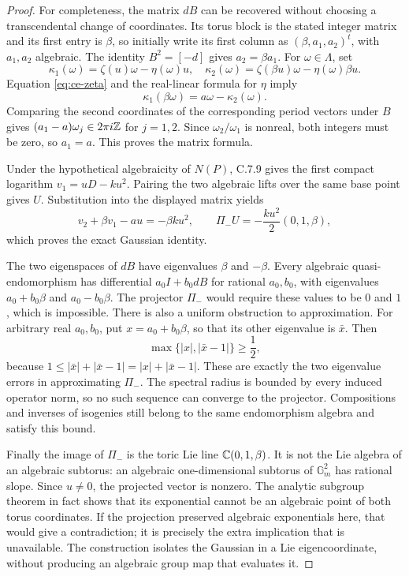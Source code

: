 \begin{proof}
For completeness, the matrix $dB$ can be recovered without
choosing a transcendental change of coordinates. Its torus
block is the stated integer matrix and its first entry is
$\beta$, so initially write its first column as
$(\beta,a_1,a_2)^t$, with $a_1,a_2$ algebraic.
The identity $B^2=[-d]$ gives $a_2=\beta a_1$.
For $\omega\in\Lambda$, set
\[
 \kappa_1(\omega)=\zeta(u)\omega-\eta(\omega)u,
 \quad
 \kappa_2(\omega)=\zeta(\beta u)\omega-\eta(\omega)\beta u.
\]
Equation \eqref{eq:ce-zeta} and the real-linear formula for
$\eta$ imply
\[
 \kappa_1(\beta\omega)=a\omega-\kappa_2(\omega).
\]
Comparing the second coordinates of the corresponding period
vectors under $B$ gives
$(a_1-a)\omega_j\in2\pi i\mathbb Z$ for $j=1,2$.
Since $\omega_2/\omega_1$ is nonreal, both integers must
be zero, so $a_1=a$. This proves the matrix formula.

Under the hypothetical algebraicity of $N(P)$, C.7.9 gives
the first compact logarithm $v_1=uD-ku^2$. Pairing the
two algebraic lifts over the same base point gives $U$.
Substitution into the displayed matrix yields
\[
 v_2+\beta v_1-au=-\beta ku^2,
 \qquad
 \Pi_-U=-\frac{ku^2}{2}(0,1,\beta),
\]
which proves the exact Gaussian identity.

The two eigenspaces of $dB$ have eigenvalues $\beta$ and
$-\beta$. Every algebraic quasi-endomorphism has differential
$a_0I+b_0dB$ for rational $a_0,b_0$, with eigenvalues
$a_0+b_0\beta$ and $a_0-b_0\beta$. The projector
$\Pi_-$ would require these values to be $0$ and $1$,
which is impossible. There is also a uniform obstruction to
approximation. For arbitrary real $a_0,b_0$, put
$x=a_0+b_0\beta$, so that its other eigenvalue is
$\bar x$. Then
\begin{equation}\label{eq:ce-gap}
 \max\{|x|,|\bar x-1|\}\ge\frac12,
\end{equation}
because $1\le|\bar x|+|\bar x-1|=|x|+|\bar x-1|$.
These are exactly the two eigenvalue errors in approximating
$\Pi_-$. The spectral radius is bounded by every induced
operator norm, so no such sequence can converge to the
projector. Compositions and inverses of isogenies still belong
to the same endomorphism algebra and satisfy this bound.

Finally the image of $\Pi_-$ is the toric Lie line
$\mathbb C(0,1,\beta)$. It is not the Lie algebra of an algebraic
subtorus: an algebraic one-dimensional subtorus of
$\mathbb G_m^2$ has rational slope. Since $u\ne0$,
the projected vector is nonzero. The analytic subgroup
theorem in fact shows that its exponential cannot be an
algebraic point of both torus coordinates. If the projection
preserved algebraic exponentials here, that would give a
contradiction; it is precisely the extra implication that
is unavailable. The construction isolates the Gaussian in
a Lie eigencoordinate, without producing an algebraic
group map that evaluates it.
\end{proof}

